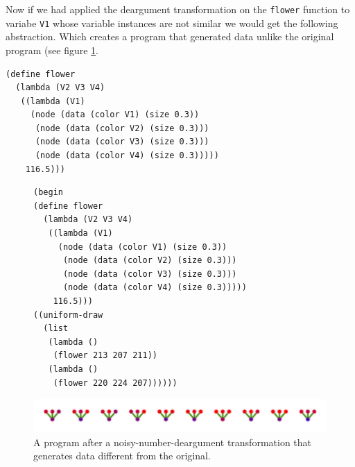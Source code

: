 \documentclass[a4paper,10pt]{article}
\begin{document}
Now if we had applied the  deargument transformation on the \texttt{flower} function to variabe \texttt{V1} whose variable instances are not similar we would get the following abstraction.  Which creates a program that generated data unlike the original program (see figure \ref{fig:noisyNumberTrans2}. 
\begin{verbatim}
(define flower
  (lambda (V2 V3 V4)
   ((lambda (V1)
     (node (data (color V1) (size 0.3))
      (node (data (color V2) (size 0.3)))
      (node (data (color V3) (size 0.3)))
      (node (data (color V4) (size 0.3)))))
    116.5)))
\end{verbatim}

\begin{figure}[h]
\begin{verbatim}
(begin
(define flower
  (lambda (V2 V3 V4)
   ((lambda (V1)
     (node (data (color V1) (size 0.3))
      (node (data (color V2) (size 0.3)))
      (node (data (color V3) (size 0.3)))
      (node (data (color V4) (size 0.3)))))
    116.5)))
((uniform-draw
  (list
   (lambda ()
    (flower 213 207 211))
   (lambda ()
    (flower 220 224 207))))))
\end{verbatim}
\begin{center}
\includegraphics[scale=.6]{noisyNumberTrans2.pdf}
\end{center}
\label{fig:noisyNumberTrans2}
\caption{A program after a noisy-number-deargument transformation that generates data different from the original.}
\end{figure}
\end{document}
